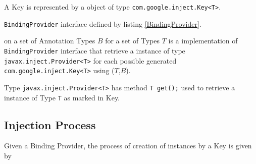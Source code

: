 A Key is represented by a object of type \lstinline|com.google.inject.Key<T>|.

\begin{defi}
  \lstinline|BindingProvider| interface defined by listing \ref{BindingProvider}.

\end{defi}

\begin{defi}
  on a set of Annotation Types $B$ for a set of Types $T$ is a implementation of \lstinline|BindingProvider| interface that retrieve a instance of type \lstinline|javax.inject.Provider<T>| for each possible generated \lstinline|com.google.inject.Key<T>| using ($T$,$B$). 
\end{defi}

Type \lstinline|javax.inject.Provider<T>| has method \lstinline|T get();| used to retrieve a instance of Type \lstinline|T| as marked in Key.

\subsection{Injection Process}
\label{sec:iocIP}

Given a Binding Provider, the process of creation of instances by a Key is given by

